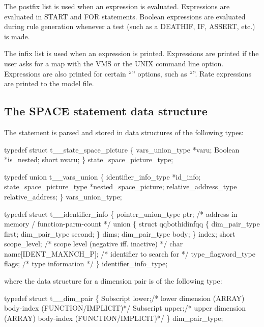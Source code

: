 The postfix list is used when an expression is evaluated.   Expressions are
evaluated in START and FOR statements.   Boolean expressions are evaluated
during rule generation whenever a test (such as a DEATHIF, IF, ASSERT, etc.)
is made.

The infix list is used when an expression is printed.   Expressions are
printed if the user asks for a map with the VMS  or the UNIX
 command line option.
Expressions are also printed for certain
``'' options, such as ``''.
Rate expressions are
printed to the model file.


\subsection{The SPACE statement data structure}
\label{sec:space}

The  statement is parsed
and stored in data structures of the following types:
\begin{codeexample}
typedef struct t__state_space_picture
   \{
       vars_union_type *varu;
       Boolean *is_nested;
       short nvaru;
   \} state_space_picture_type;
\end{codeexample}

\begin{codeexample}
typedef union t__vars_union
   \{
       identifier_info_type *id_info;
       state_space_picture_type *nested_space_picture;
       relative_address_type relative_address;
   \} vars_union_type;
\end{codeexample}


\begin{codeexample}
typedef struct t__identifier_info
  \{
     pointer_union_type ptr;    /* address in memory / function-parm-count */
     union
        \{
           struct qqbothidinfqq
              \{
                 dim_pair_type first;
                 dim_pair_type second;
              \} dims;
           dim_pair_type body;
        \} index;
     short scope_level;         /* scope level (negative iff. inactive) */
     char name[IDENT_MAXNCH_P]; /* identifier to search for */
     type_flagword_type flags;  /* type information */
  \} identifier_info_type;
\end{codeexample}
where the data structure for a dimension pair is of the following type:
\begin{codeexample}
typedef struct t__dim_pair
  \{
    Subscript lower;/* lower dimension (ARRAY) body-index (FUNCTION/IMPLICIT)*/
    Subscript upper;/* upper dimension (ARRAY) body-index (FUNCTION/IMPLICIT)*/
  \} dim_pair_type;
\end{codeexample}

